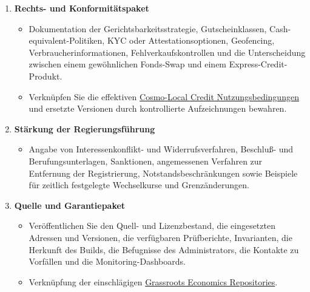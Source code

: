 \documentclass[11pt]{article}
\begin{document}
\begin{enumerate}[leftmargin=*]
\begin{itemize}[leftmargin=*]
\end{itemize}
\item \textbf{Rechts- und Konformitätspaket}
\begin{itemize}[leftmargin=*]
\item Dokumentation der Gerichtsbarkeitsstrategie, Gutscheinklassen, Cash-equivalent-Politiken, KYC oder Attestationsoptionen, Geofencing, Verbraucherinformationen, Fehlverkaufskontrollen und die Unterscheidung zwischen einem gewöhnlichen Fonds-Swap und einem Express-Credit-Produkt.
\item Verknüpfen Sie die effektiven \href{https://docs.cosmolocal.credit/de/governance/terms}{Cosmo-Local Credit Nutzungsbedingungen} und ersetzte Versionen durch kontrollierte Aufzeichnungen bewahren.
\end{itemize}
\item \textbf{Stärkung der Regierungsführung}
\begin{itemize}[leftmargin=*]
\item Angabe von Interessenkonflikt- und Widerrufsverfahren, Beschluß- und Berufungsunterlagen, Sanktionen, angemessenen Verfahren zur Entfernung der Registrierung, Notstandsbeschränkungen sowie Beispiele für zeitlich festgelegte Wechselkurse und Grenzänderungen.
\end{itemize}
\item \textbf{Quelle und Garantiepaket}
\begin{itemize}[leftmargin=*]
\item Veröffentlichen Sie den Quell- und Lizenzbestand, die eingesetzten Adressen und Versionen, die verfügbaren Prüfberichte, Invarianten, die Herkunft des Builds, die Befugnisse des Administrators, die Kontakte zu Vorfällen und die Monitoring-Dashboards.
\item Verknüpfung der einschlägigen \href{https://github.com/grassrootseconomics}{Grassroots Economics Repositories}.
\end{itemize}
\end{enumerate}
\end{document}
